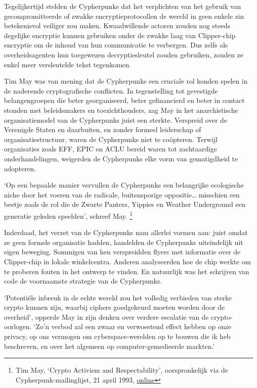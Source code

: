\documentclass[smalldemyvopaper,11pt,twoside,onecolumn,openright,extrafontsizes,hidelinks]{memoir}
\begin{document}
Tegelijkertijd stelden de Cypherpunks dat het verplichten van het
gebruik van gecompromitteerde of zwakke encryptieprotocollen de wereld
in geen enkele zin betekenisvol veiliger zou maken. Kwaadwillende
actoren zouden nog steeds degelijke encryptie kunnen gebruiken onder de
zwakke laag van Clipper-chip encryptie om de inhoud van hun communicatie
te verbergen. Dus zelfs als overheidsagenten hun toegewezen
decryptiesleutel zouden gebruiken, zouden ze enkel meer versleutelde
tekst tegenkomen.

Tim May was van mening dat de Cypherpunks een cruciale rol konden spelen
in de naderende cryptografische conflicten. In tegenstelling tot
gevestigde belangengroepen die beter georganiseerd, beter gefinancierd
en beter in contact stonden met beleidsmakers en toezichthouders, zag
May in het anarchistische organisatiemodel van de Cypherpunks juist een
sterkte. Verspreid over de Verenigde Staten en daarbuiten, en zonder
formeel leiderschap of organisatiestructuur, waren de Cypherpunks niet
te coöpteren. Terwijl organisaties zoals EFF, EPIC en ACLU bereid waren
tot zachtaardige onderhandelingen, weigerden de Cypherpunks elke vorm
van gematigdheid te adopteren.

`Op een bepaalde manier vervullen de Cypherpunks een belangrijke
ecologische niche door het voeren van de radicale, buitensporige
oppositie\ldots{} misschien een beetje zoals de rol die de Zwarte
Panters, Yippies en Weather Underground een generatie geleden speelden',
schreef May. \footnote{Tim May, `Crypto Activism and Respectability',
  oorspronkelijk via de Cypherpunk-mailinglijst, 21 april 1993,
  \href{https://cypherpunks.venona.com/date/1993/04/msg00400.html}{online}}

Inderdaad, het verzet van de Cypherpunks nam allerlei vormen aan: juist
omdat ze geen formele organisatie hadden, handelden de Cypherpunks
uiteindelijk uit eigen beweging. Sommigen van hen verspreidden flyers
met informatie over de Clipper-chip in lokale winkelcentra. Anderen
analyseerden hoe de chip werkte om te proberen fouten in het ontwerp te
vinden. En natuurlijk was het schrijven van code de voornaamste
strategie van de Cypherpunks.

`Potentiële inbreuk in de echte wereld zou het volledig verbieden van
sterke crypto kunnen zijn, waarbij ciphers goedgekeurd moeten worden
door de overheid', opperde May in zijn denken over verdere escalatie van
de crypto-oorlogen. `Zo'n verbod zal een zwaar en verwoestend effect
hebben op onze privacy, op ons vermogen om cyberspace-werelden op te
bouwen die ik heb beschreven, en over het algemeen op
computer-gemedieerde markten.'
\end{document}
